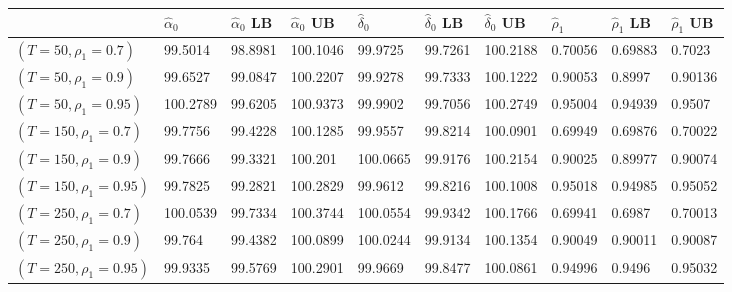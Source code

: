 \begin{tabular}{llllllllll}
& $\hat{\alpha}_0$ & $\hat{\alpha}_0$ LB & $\hat{\alpha}_0$ UB & $\hat{\delta}_0$ & $\hat{\delta}_0$ LB & $\hat{\delta}_0$ UB & $\hat{\rho}_1$ & $\hat{\rho}_1$ LB & $\hat{\rho}_1$ UB \\ 
\hline 
$(T=50,\rho_1=0.7)$ & 99.5014 & 98.8981 & 100.1046 & 99.9725 & 99.7261 & 100.2188 & 0.70056 & 0.69883 & 0.7023 \\ 
$(T=50,\rho_1=0.9)$ & 99.6527 & 99.0847 & 100.2207 & 99.9278 & 99.7333 & 100.1222 & 0.90053 & 0.8997 & 0.90136 \\ 
$(T=50,\rho_1=0.95)$ & 100.2789 & 99.6205 & 100.9373 & 99.9902 & 99.7056 & 100.2749 & 0.95004 & 0.94939 & 0.9507 \\ 
$(T=150,\rho_1=0.7)$ & 99.7756 & 99.4228 & 100.1285 & 99.9557 & 99.8214 & 100.0901 & 0.69949 & 0.69876 & 0.70022 \\ 
$(T=150,\rho_1=0.9)$ & 99.7666 & 99.3321 & 100.201 & 100.0665 & 99.9176 & 100.2154 & 0.90025 & 0.89977 & 0.90074 \\ 
$(T=150,\rho_1=0.95)$ & 99.7825 & 99.2821 & 100.2829 & 99.9612 & 99.8216 & 100.1008 & 0.95018 & 0.94985 & 0.95052 \\ 
$(T=250,\rho_1=0.7)$ & 100.0539 & 99.7334 & 100.3744 & 100.0554 & 99.9342 & 100.1766 & 0.69941 & 0.6987 & 0.70013 \\ 
$(T=250,\rho_1=0.9)$ & 99.764 & 99.4382 & 100.0899 & 100.0244 & 99.9134 & 100.1354 & 0.90049 & 0.90011 & 0.90087 \\ 
$(T=250,\rho_1=0.95)$ & 99.9335 & 99.5769 & 100.2901 & 99.9669 & 99.8477 & 100.0861 & 0.94996 & 0.9496 & 0.95032 \\ 
\hline 
\end{tabular}
